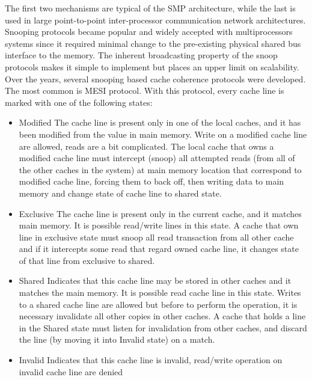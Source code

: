 The first two mechanisms are typical of the SMP architecture, while the last is used in large point-to-point inter-processor communication network 
architectures. Snooping protocols became popular and widely accepted with multiprocessors systems since it required minimal change to the pre-existing 
physical shared bus interface to the memory. The inherent broadcasting property of the snoop protocols makes it simple to implement but places an upper 
limit on scalability.
Over the years, several snooping based cache coherence protocols were developed. The most common is MESI protocol.
With this protocol, every cache line is marked with one of the following states:

\begin{itemize}

\item Modified
The cache line is present only in one of the local caches, and it has been modified from the value in main memory. Write on a modified cache line are 
allowed, reads are a bit complicated. The local cache that owns a modified cache line must intercept (snoop) all attempted reads (from all of the other 
caches in the system) at main memory location that correspond to modified cache line, forcing them to back off, then writing data to main memory and change
state of cache line to shared state.
 
\item Exclusive
The cache line is present only in the current cache, and it matches main memory. It is possible read/write lines in this state. A cache that own
line in exclusive state must snoop all read transaction from all other cache and if it intercepts some read that regard owned cache line, it changes
state of that line from exclusive to shared.

\item Shared
Indicates that this cache line may be stored in other caches and it matches the main memory. It is possible read cache line in this state. Writes to a shared
cache line are allowed but before to perform the operation, it is necessary invalidate all other copies in other caches.
A cache that holds a line in the Shared state must listen for invalidation from other caches, and discard the line (by moving it into Invalid state) on a 
match.

\item Invalid
Indicates that this cache line is invalid, read/write operation on invalid cache line are denied

\end{itemize}


